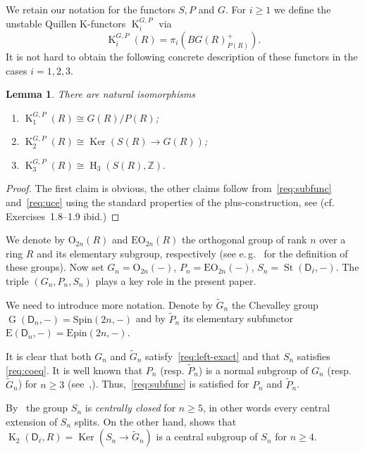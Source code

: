 \documentclass[oneside, 8pt]{amsart}
\newtheorem{lemma}{Lemma}
\theoremstyle{remark}
\theoremstyle{definition}
\numberwithin{lemma}{section}
\numberwithin{prop}{section}
\numberwithin{corollary}{section}
\numberwithin{externaltheorem}{section}
\DeclareMathOperator{\Ker}{Ker}
\DeclareMathOperator{\St}{St}
\DeclareMathOperator{\HH}{H}
\DeclareMathOperator{\K}{K}
\DeclareMathOperator{\GG}{G}
\newcommand{\ZZ}{\mathbb{Z}}
\newcommand{\rD}{\mathsf{D}}
\numberwithin{equation}{section}
\begin{document}
We retain our notation for the functors $S, P$ and $G$.
For $i\geq 1$ we define the unstable Quillen K-functors $\K_{i}^{G, P}$ via
\begin{equation} \label{plus-constr} \K_i^{G,P}(R) = \pi_i(BG(R)^+_{P(R)}). \end{equation}
It is not hard to obtain the following concrete description of these functors in the cases $i=1,2,3$.
\begin{lemma}\label{lem:lowerKgroups} There are natural isomorphisms \begin{enumerate} [label=\normalfont(\arabic*)]
 \item $\K_1^{G,P}(R) \cong G(R) / P(R)$;
 \item $\K_2^{G,P}(R) \cong \Ker(S(R) \to G(R))$;
 \item $\K_3^{G,P}(R) \cong \HH_3(S(R), \ZZ).$ \end{enumerate} \end{lemma}
\begin{proof} The first claim is obvious, the other claims follow from~\ref{req:subfunc} and~\ref{req:uce} using the standard properties of the plus-construction, see \cite[\S~IV.1]{Kbook}   (cf. Exercises~1.8--1.9 ibid.) \end{proof}

We denote by $\mathrm{O}_{2n}(R)$ and $\mathrm{EO}_{2n}(R)$ the orthogonal group of rank $n$ over a ring $R$ and its elementary subgroup, respectively (see e.\,g.~\cite{Su82} for the definition of these groups).
Now set $G_n = \mathrm{O}_{2n}(-)$, $P_n = \mathrm{EO}_{2n}(-)$, $S_n = \St(\rD_\ell, -)$.
The triple $(G_n, P_n, S_n)$ plays a key role in the present paper.

We need to introduce more notation. Denote by $\widetilde{G}_n$ the Chevalley group $\GG(\rD_n, -) = \mathrm{Spin}(2n, -)$
 and by $\widetilde{P}_n$ its elementary subfunctor $\mathrm{E}(\rD_n, -) = \mathrm{Epin}(2n, -)$.

It is clear that both $G_n$ and $\widetilde{G}_n$ satisfy~\ref{req:left-exact} and that $S_n$ satisfies \ref{req:coeq}.
It is well known that $P_n$ (resp. $\widetilde{P}_n$) is a normal subgroup of $G_n$ (resp. $\widetilde{G}_n$) for $n\geq 3$ (see~\cite{Su82},\cite{Ta86}). Thus,~\ref{req:subfunc} is satisfied for $P_n$ and $\widetilde{P}_n$.

By~\cite[Corollary~5.4]{St71} the group $S_n$ is {\it centrally closed} for $n \geq 5$, in other words every central extension of $S_n$ splits.
On the other hand, \cite[Theorem~1]{LS17} shows that $\K_2(\rD_\ell, R) = \Ker(S_n \to \widetilde{G}_n)$ is a central subgroup of $S_n$ for $n\geq 4$. 
\end{document}
